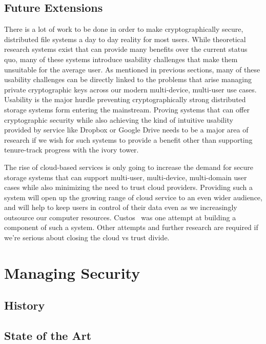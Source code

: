 \documentclass{sig-alternate}
\begin{document}
\subsection{Future Extensions}

There is a lot of work to be done in order to make cryptographically
secure, distributed file systems a day to day reality for most
users. While theoretical research systems exist that can provide many
benefits over the current status quo, many of these systems introduce
usability challenges that make them unsuitable for the average
user. As mentioned in previous sections, many of these usability
challenges can be directly linked to the problems that arise managing
private cryptographic keys across our modern multi-device, multi-user
use cases. Usability is the major hurdle preventing cryptographically
strong distributed storage systems form entering the
mainstream. Proving systems that can offer cryptographic security
while also achieving the kind of intuitive usability provided by
service like Dropbox or Google Drive needs to be a major area of
research if we wish for such systems to provide a benefit other than
supporting tenure-track progress with the ivory tower.

The rise of cloud-based services is only going to increase the demand
for secure storage systems that can support multi-user, multi-device,
multi-domain user cases while also minimizing the need to trust cloud
providers. Providing such a system will open up the growing range of
cloud service to an even wider audience, and will help to keep users
in control of their data even as we increasingly outsource our
computer resources. Custos~\cite{custos-masters} was one attempt at
building a component of such a system. Other attempts and further
research are required if we're serious about closing the cloud vs
trust divide.

\section{Managing Security}
\label{sec:mgmt}

\subsection{History}

\subsection{State of the Art}
\end{document}

